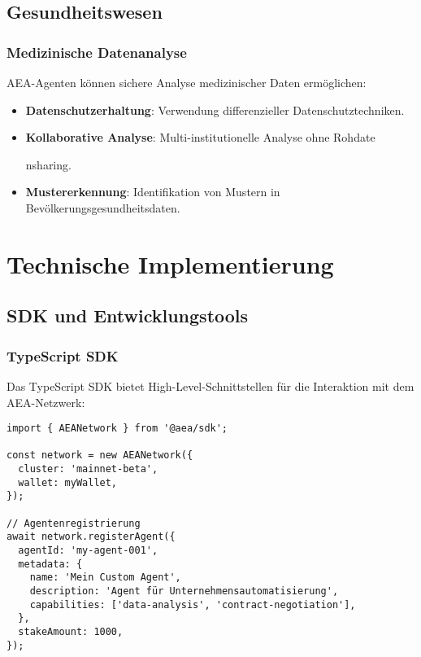 \documentclass[12pt,a4paper]{article}
\begin{document}
\subsection{Gesundheitswesen}

\subsubsection{Medizinische Datenanalyse}

AEA-Agenten können sichere Analyse medizinischer Daten ermöglichen:

\begin{itemize}
\item \textbf{Datenschutzerhaltung}: Verwendung differenzieller Datenschutztechniken.
\item \textbf{Kollaborative Analyse}: Multi-institutionelle Analyse ohne Rohdate

nsharing.
\item \textbf{Mustererkennung}: Identifikation von Mustern in Bevölkerungsgesundheitsdaten.
\end{itemize}

\section{Technische Implementierung}

\subsection{SDK und Entwicklungstools}

\subsubsection{TypeScript SDK}

Das TypeScript SDK bietet High-Level-Schnittstellen für die Interaktion mit dem AEA-Netzwerk:

\begin{verbatim}
import { AEANetwork } from '@aea/sdk';

const network = new AEANetwork({
  cluster: 'mainnet-beta',
  wallet: myWallet,
});

// Agentenregistrierung
await network.registerAgent({
  agentId: 'my-agent-001',
  metadata: {
    name: 'Mein Custom Agent',
    description: 'Agent für Unternehmensautomatisierung',
    capabilities: ['data-analysis', 'contract-negotiation'],
  },
  stakeAmount: 1000,
});
\end{verbatim}
\end{document}
